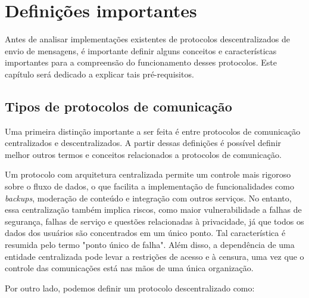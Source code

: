 
\chapter{Definições importantes}

Antes de analisar implementações existentes de protocolos descentralizados de envio de mensagens, é importante definir alguns conceitos e características importantes para a compreensão do funcionamento desses protocolos. Este capítulo será dedicado a explicar tais pré-requisitos.

\section{Tipos de protocolos de comunicação}

Uma primeira distinção importante a ser feita é entre protocolos de comunicação centralizados e descentralizados. A partir dessas definições é possível definir melhor outros termos e conceitos relacionados a protocolos de comunicação.


Um protocolo com arquitetura centralizada permite um controle mais rigoroso sobre o fluxo de dados, o que facilita a implementação de funcionalidades como \textit{backups}, moderação de conteúdo e integração com outros serviços. No entanto, essa centralização também implica riscos, como maior vulnerabilidade a falhas de segurança, falhas de serviço e questões relacionadas à privacidade, já que todos os dados dos usuários são concentrados em um único ponto. Tal característica é resumida pelo termo "ponto único de falha". Além disso, a dependência de uma entidade centralizada pode levar a restrições de acesso e à censura, uma vez que o controle das comunicações está nas mãos de uma única organização.

Por outro lado, podemos definir um protocolo descentralizado como:

